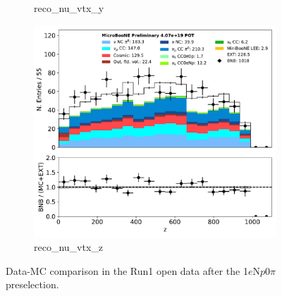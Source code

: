\documentclass[a4paper]{article}
\newcommand{\npsel}{1$e$N$p$0$\pi$ }
\begin{document}
\begin{figure}[H]
\begin{center}
\begin{subfigure}[b]{0.3\textwidth}
    \caption{\label{fig:1eNp:dataMCRun1:reco_nu_vtx_y} reco\_nu\_vtx\_y}
    \end{subfigure}
    \begin{subfigure}[b]{0.3\textwidth}
    \centering
    \includegraphics[width=1.00\textwidth]{1eNp/dataMCRun1/reco_nu_vtx_z01152020.pdf}
    \caption{\label{fig:1eNp:dataMCRun1:reco_nu_vtx_z} reco\_nu\_vtx\_z}
    \end{subfigure}
\caption{\label{fig:1eNp:dataMCRun1:reco_nu_vtx}Data-MC comparison in the Run1 open data after the \npsel preselection.}
\end{center}
\end{figure}
\end{document}
